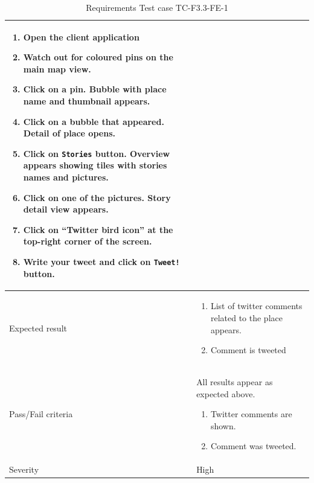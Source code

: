 \documentclass[11pt]{book}
\begin{document}
\begin{table}
\begin{tabular}{| p{3cm} | p{9.5cm} |}
                            \begin{enumerate}
                              \item Open the client application
                              \item Watch out for coloured pins on the main map view.
                              \item Click on a pin. Bubble with place name and thumbnail appears.
                              \item Click on a bubble that appeared. Detail of place opens.
                              \item Click on \texttt{Stories} button. Overview appears showing tiles with stories names and pictures.
                              \item Click on one of the pictures. Story detail view appears.
                              \item Click on ``Twitter bird icon'' at the top-right corner of the screen.
                              \item Write your tweet and click on \texttt{Tweet!} button.
                            \end{enumerate} \\ \hline 
    Expected result       & \begin{enumerate}
                              \item List of twitter comments related to the place appears.
                              \item Comment is tweeted
                            \end{enumerate} \\ \hline 
    Pass/Fail criteria    & All results appear as expected above.
                            \begin{enumerate}
                              \item Twitter comments are shown.
                              \item Comment was tweeted.
                            \end{enumerate} \\ \hline 
    Severity              & High \\ \hline 
  \end{tabular}
  \caption{Requirements Test case TC-F3.3-FE-1}
  \label{tab:TCF3.3FE1}
\end{table}
\end{document}

